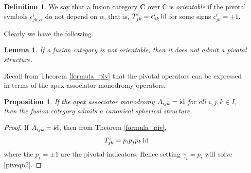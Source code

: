 \documentclass[a4paper]{article}
\theoremstyle{plain}
\newtheorem{lem}[thm]{Lemma}
\newtheorem{prop}[thm]{Proposition}
\theoremstyle{definition}
\newtheorem{defn}[thm]{Definition}
\newcommand\id{\operatorname{\text{\rm id}}}
\newcommand{\cat}{\mathbf}
\begin{document}
\begin{defn} We say that a fusion category $\cat{C}$ over $\mathbb{C}$ is {\em orientable} if the pivotal symbols $\epsilon^i_{jk, \alpha}$ do not depend on $\alpha$, that is, $T^i_{jk} = \epsilon^i_{jk} \id$ for some signs $\epsilon^i_{jk} = \pm 1$.
\end{defn}
Clearly we have the following.
\begin{lem} If a fusion category is not orientable, then it does not admit a pivotal structure. 
\end{lem}
Recall from Theorem \ref{formula_piv} that the pivotal operators can be expressed in terms of the apex associator monodromy operators.
\begin{prop} If the apex associator monodromy $A_{ijk} = \id$ for all $i,j,k \in I$, then the fusion category admits a canonical spherical structure.
\end{prop}
\begin{proof} If $A_{ijk} = \id$, then from Theorem \ref{formula_piv}, 
\[
T^i_{jk} = p_i p_j p_k \id
\]
where the $p_i = \pm 1$ are the pivotal indicators. Hence setting $\gamma_i = p_i$ will solve \eqref{piveqn2}.
\end{proof}
\end{document}
